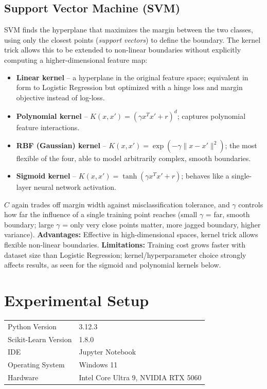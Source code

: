 \documentclass[12pt,a4paper]{article}
\begin{document}
\subsection*{Support Vector Machine (SVM)}
SVM finds the hyperplane that maximizes the margin between the two classes, using only
the closest points (\textit{support vectors}) to define the boundary. The kernel trick
allows this to be extended to non-linear boundaries without explicitly computing a
higher-dimensional feature map:
\begin{itemize}
\item \textbf{Linear kernel} -- a hyperplane in the original feature space; equivalent in
form to Logistic Regression but optimized with a hinge loss and margin objective instead
of log-loss.
\item \textbf{Polynomial kernel} -- $K(x,x')=(\gamma x^Tx'+r)^d$; captures polynomial
feature interactions.
\item \textbf{RBF (Gaussian) kernel} -- $K(x,x')=\exp(-\gamma\lVert x-x'\rVert^2)$; the
most flexible of the four, able to model arbitrarily complex, smooth boundaries.
\item \textbf{Sigmoid kernel} -- $K(x,x')=\tanh(\gamma x^Tx' + r)$; behaves like a
single-layer neural network activation.
\end{itemize}
$C$ again trades off margin width against misclassification tolerance, and $\gamma$
controls how far the influence of a single training point reaches (small $\gamma$ = far,
smooth boundary; large $\gamma$ = only very close points matter, more jagged boundary,
higher variance).
\textbf{Advantages:} Effective in high-dimensional spaces, kernel trick allows flexible
non-linear boundaries. \textbf{Limitations:} Training cost grows faster with dataset
size than Logistic Regression; kernel/hyperparameter choice strongly affects results, as
seen for the sigmoid and polynomial kernels below.

\section{Experimental Setup}
\begin{tabular}{ll}
\toprule
Python Version & 3.12.3 \\
Scikit-Learn Version & 1.8.0 \\
IDE & Jupyter Notebook \\
Operating System & Windows 11 \\
Hardware & Intel Core Ultra 9, NVIDIA RTX 5060 \\
\bottomrule
\end{tabular}
\end{document}
